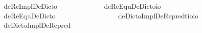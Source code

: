 \begin{isabellebody}
\ \ \ {\isachardoublequoteopen}deReImplDeDicto\ {\isasymtau}\ {\isasymequiv}\ \isactrlbold {\isasymforall}{\isasymalpha}{\isachardot}\ {\isacharparenleft}{\isacharparenleft}{\isasymlambda}{\isasymbeta}{\isachardot}\ \isactrlbold {\isasymbox}{\isacharparenleft}{\isasymalpha}\ {\isasymbeta}{\isacharparenright}{\isacharparenright}\ \isactrlbold {\isasymdownharpoonleft}{\isasymtau}{\isacharparenright}\ \isactrlbold {\isasymrightarrow}\ \isactrlbold {\isasymbox}{\isacharparenleft}{\isacharparenleft}{\isasymlambda}{\isasymbeta}{\isachardot}\ {\isacharparenleft}{\isasymalpha}\ {\isasymbeta}{\isacharparenright}{\isacharparenright}\ \isactrlbold {\isasymdownharpoonleft}{\isasymtau}{\isacharparenright}{\isachardoublequoteclose}\isanewline
{}\isamarkupfalse%
\ deReEquDeDicto{\isacharcolon}{\isacharcolon}{\isachardoublequoteopen}{\isasymup}{\isasymzero}{\isasymRightarrow}io{\isachardoublequoteclose}\ \isanewline
\ \ \ {\isachardoublequoteopen}deReEquDeDicto\ {\isasymtau}\ {\isasymequiv}\ \isactrlbold {\isasymforall}{\isasymalpha}{\isachardot}\ {\isacharparenleft}{\isacharparenleft}{\isasymlambda}{\isasymbeta}{\isachardot}\ \isactrlbold {\isasymbox}{\isacharparenleft}{\isasymalpha}\ {\isasymbeta}{\isacharparenright}{\isacharparenright}\ \isactrlbold {\isasymdownharpoonleft}{\isasymtau}{\isacharparenright}\ \isactrlbold {\isasymleftrightarrow}\ \isactrlbold {\isasymbox}{\isacharparenleft}{\isacharparenleft}{\isasymlambda}{\isasymbeta}{\isachardot}\ {\isacharparenleft}{\isasymalpha}\ {\isasymbeta}{\isacharparenright}{\isacharparenright}\ \isactrlbold {\isasymdownharpoonleft}{\isasymtau}{\isacharparenright}{\isachardoublequoteclose}\isanewline
\ \ \ \ \isanewline
{}\isamarkupfalse%
\ deDictoImplDeRe{\isacharunderscore}pred{\isacharcolon}{\isacharcolon}{\isachardoublequoteopen}{\isacharparenleft}{\isacharprime}t{\isasymRightarrow}io{\isacharparenright}{\isasymRightarrow}io{\isachardoublequoteclose}\ \isanewline
\ \ \ {\isachardoublequoteopen}deDictoImplDeRe{\isacharunderscore}pred\ {\isasymtau}\ {\isasymequiv}\ \isactrlbold {\isasymforall}{\isasymalpha}{\isachardot}\ \isactrlbold {\isasymbox}{\isacharparenleft}{\isacharparenleft}{\isasymlambda}{\isasymbeta}{\isachardot}\ {\isacharparenleft}{\isasymalpha}\ {\isasymbeta}{\isacharparenright}{\isacharparenright}\ \isactrlbold {\isasymdown}{\isasymtau}{\isacharparenright}\ \isactrlbold {\isasymrightarrow}\ {\isacharparenleft}{\isacharparenleft}{\isasymlambda}{\isasymbeta}{\isachardot}\ \isactrlbold {\isasymbox}{\isacharparenleft}{\isasymalpha}\ {\isasymbeta}{\isacharparenright}{\isacharparenright}\ \isactrlbold {\isasymdown}{\isasymtau}{\isacharparenright}{\isachardoublequoteclose}\isanewline

\end{isabellebody}
